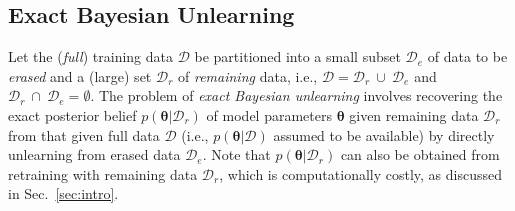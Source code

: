 \documentclass{article}
\theoremstyle{definition}
\newcommand{\mcl}[1]{\mathcal{#1}}
\newcommand{\da}{\mcl{D}}
\newcommand{\dc}{\mcl{D}_r}
\newcommand{\dr}{\mcl{D}_e}
\begin{document}
\subsection{Exact Bayesian Unlearning}
\label{subsec:exactbayesunlearn}%
%
Let the (\emph{full}) training data $\da$ be partitioned into a small subset $\dr$ of data to be \emph{erased} and a (large) set $\dc$ of \emph{remaining} data, i.e., $\da = \dc\ \cup\ \dr$ and $\dc\ \cap\ \dr = \emptyset$. 
The problem of \emph{exact Bayesian unlearning} involves
recovering the exact posterior belief $p(\bm{\theta}|\dc)$ of model parameters $\bm{\theta}$ given remaining data $\dc$ from that given full data $\da$ (i.e., $p(\bm{\theta}|\da)$ assumed to be available)
by directly unlearning from erased data $\dr$.
Note that $p(\bm{\theta}|\dc)$ can also be obtained from retraining with remaining data $\dc$, which is computationally costly, as discussed in Sec.~\ref{sec:intro}.
%
%
\end{document}
